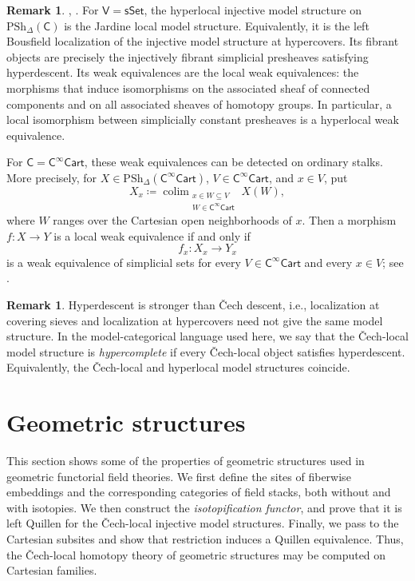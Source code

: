\documentclass{amsart}
\newcommand{\cat}[1]{\mathsf{#1}}
\newcommand{\sset}{\cat{sSet}}
\DeclareMathOperator*{\colim}{colim}
\newcommand{\Cart}{\cat{C}^{\infty}\cat{Cart}}
\newcommand{\spsh}{\mathrm{PSh}_{\Delta}}
\theoremstyle{definition}
\newtheorem{remark}[equation]{Remark}
\numberwithin{equation}{subsection}
\numberwithin{subsubsection}{subsection}
\begin{document}
\begin{remark}\label{rem:jardine.is.hyper}
  \textnormal{\cite[Corollary~2.7]{Jar87}},
  \textnormal{\cite[Theorems 1.1 and 1.2]{DHI04}}.
  For \(\cat{V}=\sset\), the hyperlocal injective model structure on
  \(\spsh(\cat{C})\) is the Jardine local model structure. Equivalently, it
  is the left Bousfield localization of the injective model structure at
  hypercovers. Its fibrant objects are precisely the injectively fibrant
  simplicial presheaves satisfying hyperdescent. Its weak equivalences are the
  local weak equivalences: the morphisms that
  induce isomorphisms on the associated sheaf of connected components and
  on all associated sheaves of homotopy groups. In particular, a local
  isomorphism between simplicially constant
  presheaves is a hyperlocal weak equivalence.

  For \(\cat{C}=\Cart\), these weak equivalences can be detected on
  ordinary stalks. More precisely, for \(X\in\spsh(\Cart)\),
  \(V\in\Cart\), and \(x\in V\), put
  \[
    X_x\coloneqq
    \colim_{\substack{x\in W\subseteq V\\ W\in\Cart}}X(W),
  \]
  where \(W\) ranges over the Cartesian open neighborhoods of \(x\).
  Then a morphism \(f:X\to Y\) is a local weak equivalence if and only
  if
  \[
    f_x:X_x\longrightarrow Y_x
  \]
  is a weak equivalence of simplicial sets for every \(V\in\Cart\) and
  every \(x\in V\); see \cite[Last paragraph of p.~48]{Jar87}.
\end{remark}

\begin{remark}\label{rem:hypercomplete.sites}
  Hyperdescent is stronger than \v{C}ech descent, i.e.,
  localization at covering sieves and localization at hypercovers need not give
  the same model structure. In the model-categorical language used here, we say
  that the
  \v{C}ech-local model structure is \emph{hypercomplete} if every \v{C}ech-local
  object satisfies hyperdescent. Equivalently, the
  \v{C}ech-local and hyperlocal model structures coincide.
\end{remark}

\section{Geometric structures}\label{sec:geometric.structures}

This section shows some of the properties of geometric structures used in
geometric functorial field theories.
We first define the sites of fiberwise embeddings and the corresponding
categories of field stacks, both without and with isotopies. We then construct
the \emph{isotopification functor}, and prove that
it is left Quillen for the \v{C}ech-local injective model structures. Finally,
we pass
to the Cartesian subsites and show that restriction induces a Quillen
equivalence. Thus, the \v{C}ech-local homotopy theory of geometric structures
may be
computed on Cartesian families.
\end{document}
